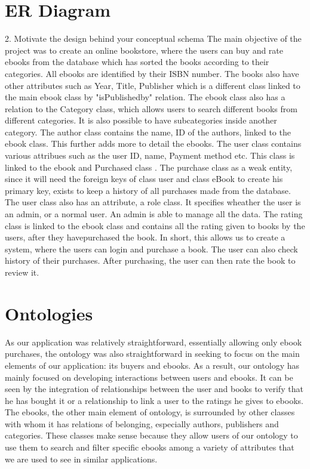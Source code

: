 \documentclass[a4paper,12pt]{article}
\begin{document}
\section{ER Diagram}
2. Motivate the design behind your conceptual schema
The main objective of the project was to create an online bookstore, where the users can buy and rate ebooks from the database which has sorted the books according to their categories.
All ebooks are identified by their ISBN number. The books also have other attributes such as Year, Title, Publisher which is a different class linked to the main ebook class by "isPublishedby" relation. The ebook class also has a relation to the Category class, which allows users to search different books from different categories. It is also possible to have subcategories inside another category. The author class contains the name, ID of the authors, linked to the ebook class. This further adds more to detail the ebooks.
The user class contains various attribues such as the user ID, name, Payment method etc. This class is linked to the ebook and Purchased class . The purchase class as a weak entity, since it will need the foreign keys of class user and class eBook to create his primary key, exists to keep a history of all purchases made from the database. The user class also has an attribute, a role class. It specifies wheather the user is an admin, or a normal user. An admin is able to manage all the data. 
The rating class is linked to the ebook class and contains all the rating given to books by the users, after they havepurchased the book.
In short, this allows us to create a system, where the users can login and purchase a book. The user can also check history of their purchases. After purchasing, the user can then rate the book to review it.

\section{Ontologies}
As our application was relatively straightforward, essentially allowing only ebook purchases, the ontology was also straightforward in seeking to focus on the main elements of our application: its buyers and ebooks. As a result, our ontology has mainly focused on developing interactions between users and ebooks. It can be seen by the integration of relationships between the user and books to verify that he has bought it or a relationship to link a user to the ratings he gives to ebooks. The ebooks, the other main element of ontology, is surrounded by other classes with whom it has relations of belonging, especially authors, publishers and categories. These classes make sense because they allow users of our ontology to use them to search and filter specific ebooks among a variety of attributes that we are used to see in similar applications.
\end{document}
